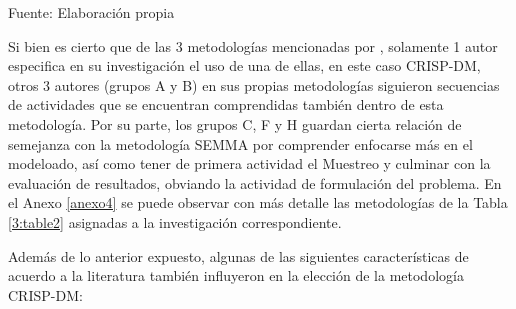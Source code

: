 \endgroup
	\begin{flushleft}	%
		\small Fuente: Elaboración propia
	\end{flushleft}

Si bien es cierto que de las 3 metodologías mencionadas por \citeauthor{tec_braulio2015metodologiasdm}, solamente 1 autor especifica en su investigación el uso de una de ellas, en este caso CRISP-DM, otros 3 autores (grupos A y B) en sus propias metodologías siguieron secuencias de actividades que se encuentran comprendidas también dentro de esta metodología. Por su parte, los grupos C, F y H guardan cierta relación de semejanza con la metodología SEMMA por comprender enfocarse más en el modeloado, así como tener de primera actividad el Muestreo y culminar con la evaluación de resultados, obviando la actividad de formulación del problema. En el Anexo \ref{anexo4} se puede observar con más detalle las metodologías de la Tabla \ref{3:table2} asignadas a la investigación correspondiente.

Además de lo anterior expuesto, algunas de las siguientes características de acuerdo a la literatura también influyeron en la elección de la metodología CRISP-DM:

